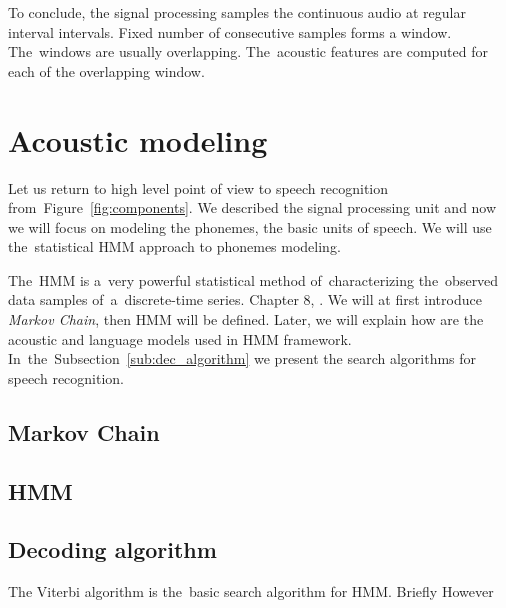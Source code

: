 To conclude, the signal processing samples the continuous audio at regular interval intervals. 
Fixed number of consecutive samples forms a window. The~windows are usually overlapping.
The~acoustic features are computed for each of the overlapping window. 

\section{Acoustic modeling}
\label{sub:decoding_with_hmm}
Let us return to high level point of view to speech recognition from~Figure~\ref{fig:components}.
We described the signal processing unit and now we will focus on modeling the phonemes, the basic
units of speech. We will use the~statistical \ac{HMM} approach to phonemes modeling.

The~\ac{HMM} is a~very powerful statistical method of~characterizing the~observed data samples 
of~a~discrete-time series. Chapter 8, \cite{huang2001spoken}.
We will at first introduce {\it Markov Chain}, then \ac{HMM} will be defined. Later,  we will explain 
how are the acoustic and language models used in \ac{HMM} framework. 
In~the~Subsection~\ref{sub:dec_algorithm} we present the search algorithms for speech recognition.


\subsection*{Markov Chain}
\label{ssub:markov_chain}

\subsection{\acl{HMM}}
\label{ssub:hmm}






\subsection*{Decoding algorithm}
\label{sub:dec_algorithm}
The Viterbi algorithm is the~basic search algorithm for \ac{HMM}. 
Briefly
However

